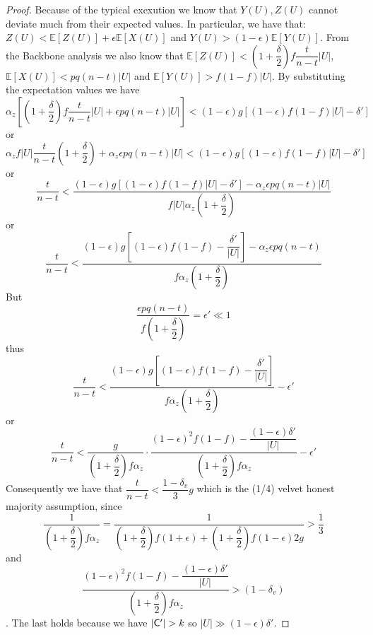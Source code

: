 \begin{proof}
Because of the typical exexution we know that $Y(U), Z(U)$ cannot deviate much from their expected values. In particular, we have that\cite{backbone}: $Z(U) < \mathbb{E}[Z(U)] + \epsilon \mathbb{E}[X(U)]$ and $Y(U) > (1-\epsilon)\mathbb{E}[Y(U)]$. From the Backbone analysis we also know that $\mathbb{E}[Z(U)] < (1+\dfrac{\delta}{2})f\dfrac{t}{n-t} \lvert U \rvert$, $\mathbb{E}[X(U)] < pq(n-t) \lvert U \rvert$ and $\mathbb{E}[Y(U)] > f(1-f) \lvert U \rvert$. By substituting the expectation values we have $ \alpha_z[(1+\dfrac{\delta}{2})f \dfrac{t}{n-t} \lvert U \rvert + \epsilon pq(n-t) \lvert U \rvert ] < (1- \epsilon)g[ (1-\epsilon)f(1-f) \lvert U \rvert - \delta' ] $ or $ \alpha_z f \lvert U \rvert \dfrac{t}{n-t}(1 + \dfrac{\delta}{2}) + \alpha_z \epsilon pq(n-t) \lvert U \rvert < (1- \epsilon)g[ (1-\epsilon)f(1-f) \lvert U \rvert - \delta' ] $ or \begin{equation*}
    \dfrac{t}{n-t} < \dfrac{ (1- \epsilon)g[ (1-\epsilon)f(1-f) \lvert U \rvert - \delta' ] - \alpha_z \epsilon pq(n-t) \lvert U \rvert }  { f \lvert U \rvert \alpha_z (1 + \dfrac{\delta}{2})}
\end{equation*} or \begin{equation*}
    \dfrac{t}{n-t} < \dfrac{  (1- \epsilon)g[ (1-\epsilon)f(1-f) - \dfrac{\delta'}{\lvert U \rvert} ] - \alpha_z \epsilon pq(n-t) }  { f \alpha_z (1 + \dfrac{\delta}{2})}
\end{equation*} But \begin{equation*}
    \dfrac{\epsilon pq(n-t)}{f(1+\dfrac{\delta}{2})} = \epsilon' \ll 1
\end{equation*} thus \begin{equation*}
    \dfrac{t}{n-t} < \dfrac{  (1- \epsilon)g[ (1-\epsilon)f(1-f) - \dfrac{\delta'}{\lvert U \rvert} ] }  { f \alpha_z (1 + \dfrac{\delta}{2})} - \epsilon'
\end{equation*} or \begin{equation*}
    \dfrac{t}{n-t} < \dfrac{g}{(1+\dfrac{\delta}{2})f\alpha_z} \cdot \dfrac{(1-\epsilon)^2 f(1-f) - \dfrac{(1-\epsilon)\delta'}{\lvert U \rvert} }{(1+\dfrac{\delta}{2})f\alpha_z} - \epsilon'
\end{equation*} Consequently we have that $\dfrac{t}{n-t} < \dfrac{1-\delta_v}{3}g$ which is the (1/4) velvet honest majority assumption, since \begin{equation*}
    \dfrac{1}{(1+\dfrac{\delta}{2})f\alpha_z} = \dfrac{1}{(1+\dfrac{\delta}{2})f(1+\epsilon) + (1+\dfrac{\delta}{2})f(1-\epsilon)2g} > \dfrac{1}{3}
\end{equation*} and \begin{equation*}
    \dfrac{(1-\epsilon)^2 f(1-f) - \dfrac{(1-\epsilon)\delta'}{\lvert U \rvert} }{(1+\dfrac{\delta}{2})f\alpha_z} > (1 - \delta_v)
\end{equation*}. The last holds because we have $\lvert \mathsf{C}' \rvert > k$ so $\lvert U \rvert \gg (1-\epsilon)\delta'$.
\end{proof}

